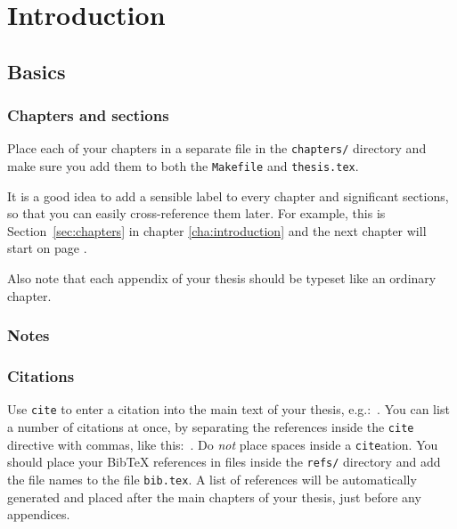\chapter{\label{cha:introduction}Introduction}


\section{Basics}

\subsection{\label{sec:chapters}Chapters and sections}

Place each of your chapters in a separate file in the \verb!chapters/!
directory and make sure you add them to both the \verb!Makefile! and
\verb!thesis.tex!.

It is a good idea to add a sensible label to every chapter and
significant sections, so that you can easily cross-reference them
later. For example, this is Section~\ref{sec:chapters} in chapter
\ref{cha:introduction} and the next chapter will start on page
\pageref{cha:example}.

Also note that each appendix of your thesis should be typeset like an
ordinary chapter.

\subsection{Notes}


\subsection{Citations}

Use \verb!cite! to enter a citation into the main text of your thesis,
e.g.:~\cite{Roscoe+97}. You can list a number of citations at once, by
separating the references inside the \verb!cite! directive with
commas, like this:~\cite{Geurts90,Martin96,Welch+99}. Do \emph{not}
place spaces inside a \verb!cite!ation. You should place your BibTeX
references in files inside the \verb!refs/! directory and add the file
names to the file \verb!bib.tex!. A list of references will be
automatically generated and placed after the main chapters of your
thesis, just before any appendices.


